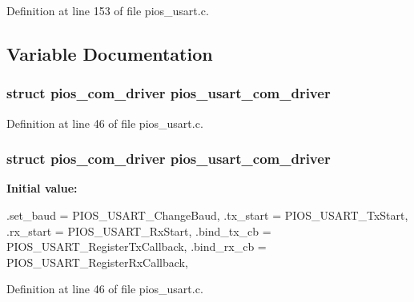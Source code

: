 \-Definition at line 153 of file pios\-\_\-usart.\-c.



\subsection{\-Variable \-Documentation}
\hypertarget{group___p_i_o_s___u_s_a_r_t_gae7414398fe53c376d74ea4c0eecb0670}{
\subsubsection[{pios\-\_\-usart\-\_\-com\-\_\-driver}]{\setlength{\rightskip}{0pt plus 5cm}struct {\bf pios\-\_\-com\-\_\-driver} {\bf pios\-\_\-usart\-\_\-com\-\_\-driver}}}\label{group___p_i_o_s___u_s_a_r_t_gae7414398fe53c376d74ea4c0eecb0670}


\-Definition at line 46 of file pios\-\_\-usart.\-c.

\hypertarget{group___p_i_o_s___u_s_a_r_t_gae7414398fe53c376d74ea4c0eecb0670}{
\subsubsection[{pios\-\_\-usart\-\_\-com\-\_\-driver}]{\setlength{\rightskip}{0pt plus 5cm}struct {\bf pios\-\_\-com\-\_\-driver} {\bf pios\-\_\-usart\-\_\-com\-\_\-driver}}}\label{group___p_i_o_s___u_s_a_r_t_gae7414398fe53c376d74ea4c0eecb0670}
{\bfseries \-Initial value\-:}
\begin{DoxyCode}
 {
        .set_baud   = PIOS_USART_ChangeBaud,
        .tx_start   = PIOS_USART_TxStart,
        .rx_start   = PIOS_USART_RxStart,
        .bind_tx_cb = PIOS_USART_RegisterTxCallback,
        .bind_rx_cb = PIOS_USART_RegisterRxCallback,
}
\end{DoxyCode}


\-Definition at line 46 of file pios\-\_\-usart.\-c.

